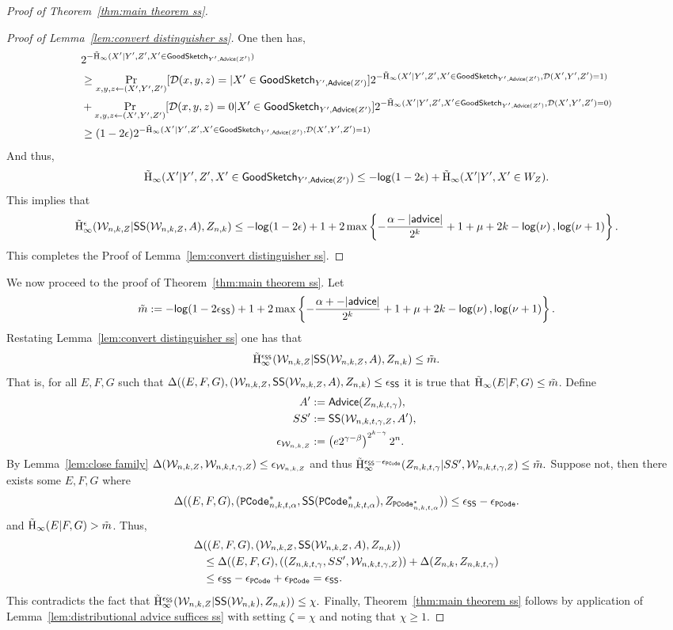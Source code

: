 \begin{proof}[Proof of Theorem~\ref{thm:main theorem ss}]
\begin{proof}[Proof of Lemma~\ref{lem:convert distinguisher ss}]
One then has, 
\begin{align*}
&2^{-\tilde{\mathrm{H}}_\infty(X'|Y', Z',X'\in\mathsf{GoodSketch}_{Y', {\mathsf{Advice}}(Z')})} \\&\ge \Pr_{x, y, z\leftarrow (X', Y', Z')} [\mathcal{D}(x, y, z)= | X'\in\mathsf{GoodSketch}_{Y', {\mathsf{Advice}}(Z')}] 2^{-\tilde{\mathrm{H}}_\infty(X'|Y', Z', X'\in\mathsf{GoodSketch}_{Y', {\mathsf{Advice}}(Z')}, \mathcal{D}(X', Y', Z')=1) }\\&+ \Pr_{x, y, z\leftarrow (X', Y', Z') } [\mathcal{D}(x, y, z)=0| X'\in\mathsf{GoodSketch}_{Y', {\mathsf{Advice}}(Z')}] 2^{-\tilde{\mathrm{H}}_\infty(X'|Y', Z', X'\in\mathsf{GoodSketch}_{Y', {\mathsf{Advice}}(Z')}, \mathcal{D}(X', Y', Z')=0) }\\
 &\ge  (1-2\epsilon)2^{-\tilde{\mathrm{H}}_\infty(X'|Y',Z', X'\in\mathsf{GoodSketch}_{Y', {\mathsf{Advice}}(Z')},  \mathcal{D}(X', Y', Z')=1) }
\end{align*}
And thus, 
\[
\tilde{\mathrm{H}}_\infty(X'|Y', Z', X'\in\mathsf{GoodSketch}_{Y', {\mathsf{Advice}}(Z')}) \le  -\mathsf{log}\!\left(1-2\epsilon\right) +\tilde{\mathrm{H}}_\infty(X'|Y', X'\in W_Z).
\]
This implies that 
\[
\tilde{\mathrm{H}}_\infty^\epsilon(\mathcal{W}_{n,k, Z}| {\mathsf{SS}}(\mathcal{W}_{n,k, Z}, A), Z_{n,k}) \le -\mathsf{log}\!\left(1-2\epsilon\right) +1 + 2\max\left\{-\frac{\alpha-|{\mathsf{advice}}|}{2^k}+1+\mu+2k-\mathsf{log}\!\left(\nu\right), \mathsf{log}\!\left(\nu+1\right)\right\}.
\]
This completes the Proof of Lemma~\ref{lem:convert distinguisher ss}.
\end{proof}

\noindent
We now proceed to the proof of Theorem~\ref{thm:main theorem ss}.   Let \[\tilde{m}:= -\mathsf{log}\!\left(1-2\epsilon_{\mathsf{SS}}\right) +1 + 2\max\left\{-\frac{\alpha+-|{\mathsf{advice}}|}{2^k}+1+\mu+2k-\mathsf{log}\!\left(\nu\right), \mathsf{log}\!\left(\nu+1\right)\right\}.\]  Restating Lemma~\ref{lem:convert distinguisher ss} one has that 
\[
\tilde{\mathrm{H}}_\infty^{\epsilon_{\mathsf{SS}}}(\mathcal{W}_{n,k, Z} |  {\mathsf{SS}}(\mathcal{W}_{n,k, Z}, A), Z_{n,k}) \le \tilde{m}.
\]
That is, for all $E, F,G$ such that $\Delta((E, F, G), (\mathcal{W}_{n,k, Z},  {\mathsf{SS}}(\mathcal{W}_{n,k, Z}, A), Z_{n,k})\le \epsilon_{{\mathsf{SS}}}$ it is true that $\tilde{\mathrm{H}}_\infty(E|F,G) \le \tilde{m}$.  Define \begin{align*}A'&:={\mathsf{Advice}}(Z_{n,k,t,\gamma}),\\
SS'&:={\mathsf{SS}}(\mathcal{W}_{n,k,t,\gamma, Z}, A'),\\
\epsilon_{\mathcal{W}_{n,k, Z}}&:= \left(e2^{\gamma-\beta}\right)^{2^{k-\gamma}}2^n.
\end{align*}
By Lemma~\ref{lem:close family} $\Delta(\mathcal{W}_{n,k, Z}, \mathcal{W}_{n,k,t,\gamma, Z}) \le \epsilon_{\mathcal{W}_{n,k, Z}}$ and thus
$
\tilde{\mathrm{H}}_\infty^{\epsilon_{{\mathsf{SS}}}-\epsilon_{\mathtt{PCode}}}(Z_{n,k,t,\gamma} | SS', \mathcal{W}_{n,k,t,\gamma, Z})\le \tilde{m}.
$
Suppose not, then there exists some $E, F, G$ where 
\[
\Delta((E, F, G), (\mathtt{PCode}_{n, k, t, \alpha}^{*} , {\mathsf{SS}}(\mathtt{PCode}_{n, k, t, \alpha}^{*}), Z_{\mathtt{PCode}_{n, k, t, \alpha}^{*}}))\le \epsilon_{{\mathsf{SS}}}-\epsilon_{\mathtt{PCode}}.
\]
and $\tilde{\mathrm{H}}_\infty(E|F, G)>\tilde{m}$.
Thus, 
\begin{align*}
\Delta&((E, F, G), (\mathcal{W}_{n,k, Z} ,  {\mathsf{SS}}(\mathcal{W}_{n,k, Z}, A), Z_{n,k}))\\
&\le \Delta((E, F, G), ((Z_{n,k,t,\gamma} , SS', \mathcal{W}_{n,k,t,\gamma, Z}))+\Delta(Z_{n,k}, Z_{n,k,t,\gamma})\\
&\le \epsilon_{{\mathsf{SS}}}-\epsilon_{\mathtt{PCode}}+ \epsilon_{\mathtt{PCode}} = \epsilon_{{\mathsf{SS}}}.
\end{align*}
This contradicts the fact that $\tilde{\mathrm{H}}_\infty^{\epsilon_{\mathsf{SS}}}(\mathcal{W}_{n,k, Z} | {\mathsf{SS}}(\mathcal{W}_{n,k}), Z_{n,k})) \le \chi.$
Finally, Theorem~\ref{thm:main theorem ss} follows by application of Lemma~\ref{lem:distributional advice suffices ss} with setting $\zeta = \chi$ and noting that $\chi\ge 1$.


\end{proof}
